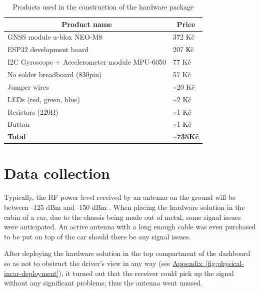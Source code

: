 \documentclass[FM,BP,EN,fonts]{tulthesis}
\newcommand{\aref}[1]{\hyperref[#1]{Appendix~\ref*{#1}}}
\begin{document}
\begin{table}[ht]
    \centering
    \begin{tabular}{|l|l|}
        \hline
        \multicolumn{1}{|c|}{\textbf{Product name}} & \multicolumn{1}{c|}{\textbf{Price}}   \\ \hline
        GNSS module u-blox NEO-M8                             & 372 Kč          \\ \hline
        ESP32 development board                               & 207 Кč     \\ \hline
        I2C Gyroscope + Accelerometer module MPU-6050     & 77 Kč      \\ \hline
        No solder breadboard (830pin)                         & 57 Kč          \\ \hline
        Jumper wires                                          & \~{}20 Kč          \\ \hline
        LEDs  (red, green, blue)                              & \~{}2 Kč          \\ \hline
        Resistors (220Ω)                                      & \~{}1 Kč          \\ \hline
        Button                                                & \~{}1 Kč          \\ \hline
        \textbf{Total}                                        & \textbf{\~{}735Kč} \\ \hline
    \end{tabular}
    \caption{Products used in the construction of the hardware package}
    \label{tab:cost-breakdown}
\end{table}

\section{Data collection}
Typically, the RF power level received by an antenna on the ground will be between -125 dBm and -150 dBm \cite{receiver-sensitivity-testing}. When placing the hardware solution in the cabin of a car, due to the chassis being made out of metal, some signal issues were anticipated. An active antenna with a long enough cable was even purchased to be put on top of the car should there be any signal issues. 

After deploying the hardware solution in the top compartment of the dashboard so as not to obstruct the driver's view in any way (see \aref{fig:physical-incar-deployment}), it turned out that the receiver could pick up the signal without any significant problems; thus the antenna went unused.
\end{document}
